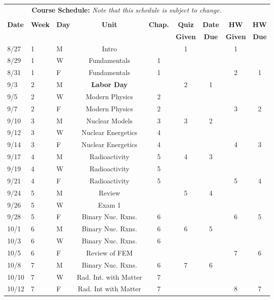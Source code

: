 \documentclass[11pt, a4paper]{article}
\begin{document}
\pagebreak
\FloatBarrier
\renewcommand{\arraystretch}{1}
\begin{table}[h]
\begin{center}
\begin{tabular}{lllcccccc}
\multicolumn{8}{c}{\textbf{Course Schedule:}\textit{ Note that this schedule is 
subject to change.}}\\
&&&&&&&&\\
\textbf{Date} & \textbf{Week} & \textbf{Day} & \textbf{Unit} & \textbf{Chap.} & \textbf{Quiz}& \textbf{Date} & \textbf{HW} & \textbf{HW}\\
              &  &  &  &  & \textbf{Given} & \textbf{Due} & \textbf{Given} & \textbf{Due}\\ \hline
\hline
8/27 & 1 & M  & Intro &  & 1 &  & 1 & \\
8/29 & 1 & W & Fundamentals & 1 &  &  &  &  \\
8/31 & 1 & F & Fundamentals & 1 &  &  & 2 & 1 \\
9/3 & 2 & M & \textbf{Labor Day}  &  & 2 & 1 &  &  \\
9/5 & 2 & W & Modern Physics  & 2 &  &  &  &  \\
9/7 & 2 & F & Modern Physics & 2 &  &  & 3 & 2 \\
9/10 & 3 & M & Nuclear Models  & 3 & 3 & 2 &  &  \\
9/12 & 3 & W & Nuclear Energetics  & 4 &  &  &  &  \\
9/14 & 3 & F & Nuclear Energetics  & 4 &  &  & 4 & 3 \\
9/17 & 4 & M & Radioactivity  & 5 & 4 & 3 &  &  \\
9/19 & 4 & W & Radioactivity  & 5 &  &  &  &  \\
9/21 & 4 & F & Radioactivity  & 5 &  &  & 5 & 4 \\
9/24 & 5 & M & Review  &  & 5 & 4 &  &  \\
9/26 & 5 & W & Exam 1  &  &  &  &  &  \\
9/28 & 5 & F & Binary Nuc. Rxns.  & 6 &  &  & 6 & 5 \\
10/1 & 6 & M & Binary Nuc. Rxns.  & 6 & 6 & 5 &  &  \\
10/3 & 6 & W & Binary Nuc. Rxns.  & 6 &  &  &  &  \\
10/5 & 6 & F & Review of FEM&  &  &  & 7 & 6 \\
10/8 & 7 & M & Binary Nuc. Rxns. & 6 & 7 & 6 &  &  \\
10/10 & 7 & W & Rad. Int. with Matter  & 7 &  &  &  &  \\
10/12 & 7 & F & Rad. Int with Matter  & 7 &  &  & 8 & 7 \\

\end{tabular}
\end{center}
\end{table}
\end{document}
